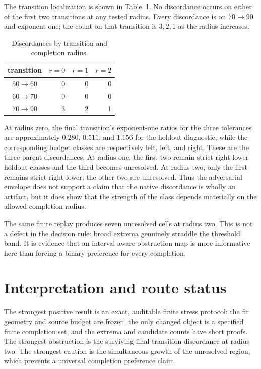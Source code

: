 \documentclass[11pt]{article}
\begin{document}
The transition localization is shown in Table~\ref{tab:pair}.  No
discordance occurs on either of the first two transitions at any tested
radius.  Every discordance is on $70\to90$ and exponent one; the count on
that transition is $3,2,1$ as the radius increases.

\begin{table}[t]
\centering\small
\caption{Discordances by transition and completion radius.}
\label{tab:pair}
\begin{tabular}{c r r r}
\toprule
transition & $r=0$ & $r=1$ & $r=2$\\
\midrule
$50\to60$ & 0 & 0 & 0\\
$60\to70$ & 0 & 0 & 0\\
$70\to90$ & 3 & 2 & 1\\
\bottomrule
\end{tabular}
\end{table}

At radius zero, the final transition's exponent-one ratios for the three
tolerances are approximately $0.280$, $0.511$, and $1.156$ for the
holdout diagnostic, while the corresponding budget classes are respectively
left, left, and right.  These are the three parent discordances.  At radius
one, the first two remain strict right-lower holdout classes and the third
becomes unresolved.  At radius two, only the first remains strict
right-lower; the other two are unresolved.  Thus the adversarial envelope
does not support a claim that the native discordance is wholly an artifact,
but it does show that the strength of the class depends materially on the
allowed completion radius.

The same finite replay produces seven unresolved cells at radius two.  This
is not a defect in the decision rule: broad extrema genuinely straddle the
threshold band.  It is evidence that an interval-aware obstruction map is
more informative here than forcing a binary preference for every completion.

\section{Interpretation and route status}

The strongest positive result is an exact, auditable finite stress protocol:
the fit geometry and source budget are frozen, the only changed object is a
specified finite completion set, and the extrema and candidate counts have
short proofs.  The strongest obstruction is the surviving final-transition
discordance at radius two.  The strongest caution is the simultaneous growth
of the unresolved region, which prevents a universal completion preference
claim.
\end{document}
